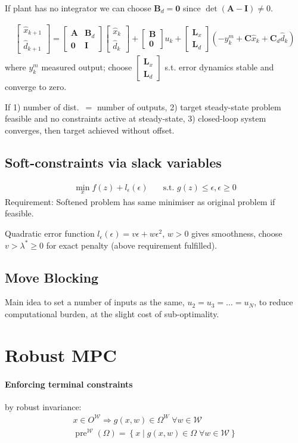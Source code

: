 \documentclass[landscape,a4paper,8pt]{scrartcl}
\renewcommand{\implies}{\Rightarrow}
\newcommand{\mc}[1]{\mathcal{#1}}
\newcommand\vA{\bm{A}}
\newcommand\vB{\bm{B}}
\newcommand\vC{\bm{C}}
\newcommand\vI{\bm{I}}
\newcommand\vL{\bm{L}}
\newcommand{\Me}[1]{\begin{bmatrix}#1\end{bmatrix}} %
\DeclareMathOperator\pre{pre}
\begin{document}
\begin{multicols*}{3}
If plant has no integrator we can choose $\vB_d = \bm 0$ since $\det(\vA-\vI) \neq 0$.

\begin{align*}
\Me{\hat x_{k+1} \\ \hat d_{k+1}} = \Me{\vA & \vB_d \\ \bm 0 & \vI}\Me{\hat x_k \\ \hat d_k} + \Me{\vB \\ \bm 0}u_k + \Me{\vL_x \\ \vL_d}\left(-y_k^m + \vC\hat x_k + \vC_d \hat d_k\right)
\end{align*}
where $y_k^m$ measured output; choose $\Me{\vL_x \\ \vL_d}$ s.t. error dynamics stable and converge to zero.

If 1) number of dist.\ $=$ number of outputs, 2) target steady-state problem feasible and no constraints active at steady-state, 3) closed-loop system converges, then target achieved without offset.


\subsection{Soft-constraints via slack variables}
\begin{align*}
\min_x f(z) + l_\epsilon(\epsilon) & \quad \text{s.t.\ } g(z) \leq \epsilon, \epsilon \geq 0
\end{align*}
Requirement: Softened problem has same minimiser as original problem if feasible.

Quadratic error function $l_\epsilon(\epsilon) = v\epsilon + w\epsilon^2$, $w > 0$ gives smoothness, choose $v > \lambda^* \geq 0$ for exact penalty (above requirement fulfilled).

\subsection{Move Blocking}
Main idea to set a number of inputs as the same, $u_2 = u_3 = \dots = u_N$, to reduce computational burden, at the slight cost of sub-optimality.

\section{Robust MPC}
\paragraph{Enforcing terminal constraints} by robust invariance:
\begin{align*}
x \in O^{\mc W} \implies g(x, w) \in \Omega^W \; \forall w \in \mc W \\
\pre^{\mc W}(\Omega) = \left\{ x \middle| g(x, w) \in \Omega \; \forall w \in \mc W\right\}
\end{align*}


\end{multicols*}
\end{document}
